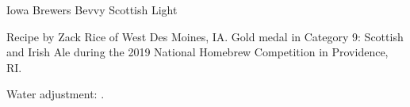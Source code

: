 \stylesection{\stylescottishlight}

\begin{recipe}{Iowa Brewers Bevvy Scottish Light} %

\begin{aboutblock}
Recipe by Zack Rice of West Des Moines, IA. Gold medal in Category 9: Scottish
and Irish Ale during the 2019 National Homebrew Competition in Providence, RI.
\sourceaha
\end{aboutblock}


\begin{methodandtiming}
 
\begin{mashsteps}
\end{mashsteps}

\begin{fermentationsteps}
\end{fermentationsteps}

\begin{directions}
Water adjustment: .
\end{directions}

\end{methodandtiming}

\recipebreak

\begin{ingredientsblock}

\begin{malts}
\end{malts}

\begin{hops}
\end{hops}


\end{ingredientsblock}

\end{recipe}

